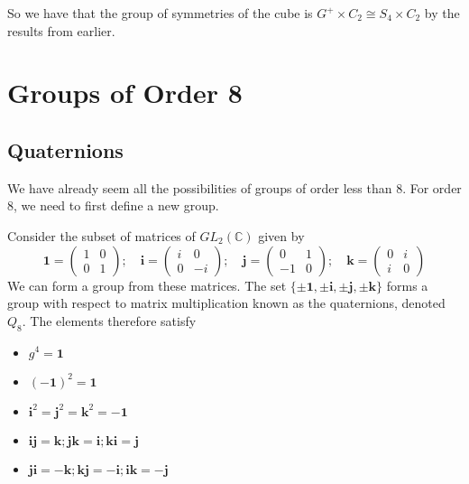 \documentclass{article}
\begin{document}
	So we have that the group of symmetries of the cube is $G^+ \times C_2 \cong S_4 \times C_2$ by the results from earlier.

	\section{Groups of Order 8}
	\subsection{Quaternions}
	We have already seem all the possibilities of groups of order less than 8. For order 8, we need to first define a new group.
	\begin{definition}
		Consider the subset of matrices of $GL_2(\mathbb C)$ given by
		\[ \bm 1 = \begin{pmatrix}
			1 & 0 \\ 0 & 1
		\end{pmatrix};\quad \bm i = \begin{pmatrix}
			i & 0 \\ 0 & -i
		\end{pmatrix};\quad \bm j = \begin{pmatrix}
			0 & 1 \\ -1 & 0
		\end{pmatrix};\quad \bm k = \begin{pmatrix}
			0 & i \\ i & 0
		\end{pmatrix} \]
		We can form a group from these matrices. The set $\{ \pm \bm 1, \pm \bm i, \pm \bm j, \pm \bm k \}$ forms a group with respect to matrix multiplication known as the quaternions, denoted $Q_8$. The elements therefore satisfy
		\begin{itemize}
			\item $g^4 = \bm 1$
			\item $(-\bm 1)^2 = \bm 1$
			\item $\bm i^2 = \bm j^2 = \bm k^2 = -\bm 1$
			\item $\bm i \bm j = \bm k; \bm j \bm k = \bm i; \bm k \bm i = \bm j$
			\item $\bm j \bm i = -\bm k; \bm k \bm j = -\bm i; \bm i \bm k = -\bm j$
		\end{itemize}
	\end{definition}
\end{document}
